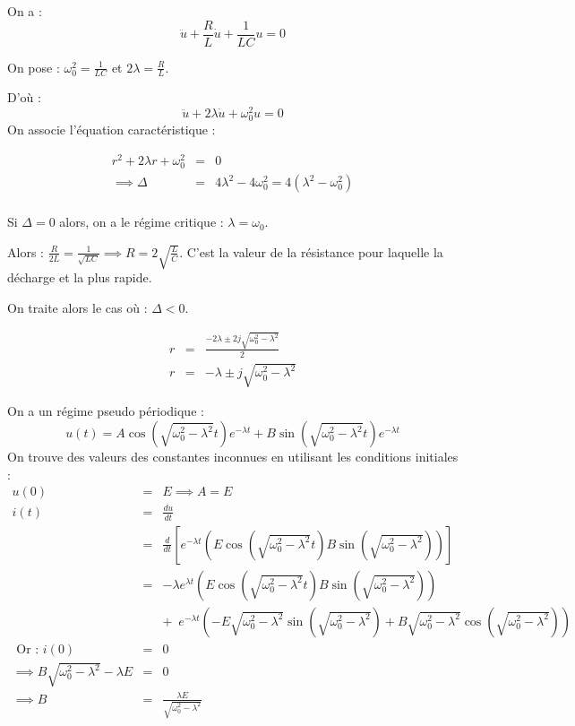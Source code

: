 On a : 
\[
    \ddot{u} + \frac{R}{L}\dot{u} + \frac{1}{LC}u = 0
\]

\begin{notation}
    On pose : \(\omega_{\text{0}}^{2} = \frac{1}{LC}\) et \(2\lambda  = \frac{R}{L}\).   
\end{notation}
D'où : 
\[
    \ddot{u} + 2\lambda \dot{u} + \omega_{\text{0}}^{2} u = 0
\]
On associe l'équation caractéristique : 

\begin{eqnarray*}
    r^{2} + 2\lambda r + \omega_{\text{0}}^{2} &=& 0 \\
    \implies \Delta &=& 4\lambda^{2} -4\omega_{\text{0}}^{2} = 4(\lambda^{2} - \omega_{\text{0}}^{2}) \\
\end{eqnarray*}

\begin{remark}
    Si \(\Delta = 0\) alors, on a le régime critique : \(\lambda = \omega_{\text{0}}\). \par
    Alors : \(\frac{R}{2L} = \frac{1}{\sqrt{LC}} \implies R = 2\sqrt{\frac{L}{C}}\). C'est la valeur de la résistance pour laquelle la décharge et la plus rapide.   

\end{remark}

On traite alors le cas où : \(\Delta <0\). \par
\begin{eqnarray*}
    r &=& \frac{-2\lambda \pm 2 j \sqrt{\omega_{\text{0}}^{2}-\lambda^{2}}}{2} \\
    r &=& -\lambda \pm j\sqrt{\omega_{\text{0}}^{2}-\lambda^{2}}
\end{eqnarray*}

On a un régime pseudo périodique : 
\[
    u(t) = A \cos (\sqrt{\omega_{\text{0}}^{2}-\lambda^{2}}t)e^{ -\lambda t } + B \sin ( \sqrt{\omega_{\text{0}}^{2}-\lambda^{2}} t ) e^{ -\lambda t }
\]
On trouve des valeurs des constantes inconnues en utilisant les conditions initiales : 
\begin{eqnarray*}
    u(0) &=& E \implies A = E \\
    i(t) &=& \frac{du}{dt} \\
    &=& \frac{d}{dt}\left[e^{ -\lambda t }\left(E\cos (\sqrt{\omega_{\text{0}}^{2}-\lambda^{2}} t) B\sin(\sqrt{\omega_{\text{0}}^{2}-\lambda^{2}})\right)\right] \\
    &=& -\lambda e^{ \lambda t } \left(  E\cos (\sqrt{\omega_{\text{0}}^{2}-\lambda^{2}} t) B\sin(\sqrt{\omega_{\text{0}}^{2}-\lambda^{2}})\right)  \\
    && + \, \, \, e^{ -\lambda t } \left( -E\sqrt{\omega_{\text{0}}^{2}-\lambda^{2}} \sin \left( \sqrt{\omega_{\text{0}}^{2}-\lambda^{2}} \right) + B \sqrt{\omega_{\text{0}}^{2}-\lambda^{2}} \cos \left( \sqrt{\omega_{\text{0}}^{2}-\lambda^{2}} \right)\right)\\
    \text{ Or :  } i(0) &=& 0 \\
    \implies B\sqrt{\omega_{\text{0}}^{2}-\lambda^{2}} - \lambda E &=& 0 \\
    \implies  B &=& \frac{\lambda E}{\sqrt{\omega_{\text{0}}^{2}-\lambda^{2}}}
\end{eqnarray*}

